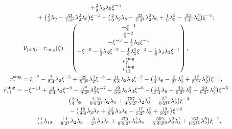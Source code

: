 \documentclass[pdftex]{sigma}
\numberwithin{equation}{section}
\begin{document}
\begin{gather*}
 + \tfrac{2}{9} \lambda_2 \lambda_5 \xi^{-4} \notag \\
\hphantom{\mathcal{V}_{(3,7)}\colon \ r_{11}^{\textup{sing}} =}{}
+ \big(\tfrac{2}{3}\lambda_9 + \tfrac{32}{7\cdot 3^3}\lambda_2^2 \lambda_5\big) \xi^{-2} - \big(\tfrac{2}{9}\lambda_2 \lambda_8 - \tfrac{32}{7\cdot 3^3}\lambda_2^2 \lambda_6 +
 \tfrac{1}{9}\lambda_5^2 - \tfrac{32}{7\cdot 3^6} \lambda_2^5 \big) \xi^{-1}; \notag\\
 \mathcal{V}_{(4,5)}\colon \ r_{\textup{sing}} (\xi) =\begin{pmatrix} -\xi^{-1} \\
 \xi^{-2} \\ -\xi^{-3} - \tfrac{1}{4}\lambda_2 \xi^{-1} \vspace{1mm}\\ -\xi^{-6} - \tfrac{1}{2}\lambda_3 \xi^{-3}
 - \tfrac{1}{8} \lambda_2^2 \xi^{-2} + \tfrac{1}{8} \lambda_2 \lambda_3 \xi^{-1} \vspace{1mm}\\
 r_{7}^{\textup{sing}} \\ r_{11}^{\textup{sing}}
 \end{pmatrix}, \\ %
\hphantom{\mathcal{V}_{(4,5)}\colon}{} \ r_{7}^{\textup{sing}} = \xi^{-7} - \tfrac{7}{5\cdot 4} \lambda_2 \xi^{-5} + \tfrac{29}{5\cdot 2^5} \lambda_2^2 \xi^{-3}
 - \tfrac{11}{5\cdot 8}\lambda_2 \lambda_3 \xi^{-2} - \big(\tfrac{1}{4} \lambda_6 - \tfrac{3}{2^5} \lambda_3^2
 + \tfrac{17}{5\cdot 2^7} \lambda_2^3\big) \xi^{-1}, \notag \\
\hphantom{\mathcal{V}_{(4,5)}\colon}{} \ r_{11}^{\textup{sing}} = -\xi^{-11} + \tfrac{11}{9\cdot 4} \lambda_2 \xi^{-9}
 - \tfrac{7^2}{9\cdot 2^5} \lambda_2^2 \xi^{-7} + \tfrac{19}{9\cdot 8}\lambda_2 \lambda_3 \xi^{-6}
 - \!\big(\tfrac{11}{5\cdot 4}\lambda_6 - \tfrac{33}{5\cdot 2^5} \lambda_3^2
 - \tfrac{29}{9\cdot 2^7} \lambda_2^3\big) \xi^{-5} \notag\\
\hphantom{\mathcal{V}_{(4,5)}\colon \ r_{11}^{\textup{sing}} =}{}
 - \big(\tfrac{3}{4} \lambda_8 - \tfrac{2\cdot 16}{9\cdot 5\cdot 2^4} \lambda_2 \lambda_6
 + \tfrac{757}{9\cdot 5\cdot 2^7} \lambda_2 \lambda_3^2 - \tfrac{5^3}{9\cdot 2^{11}} \lambda_2^4\big) \xi^{-3}\nonumber\\
\hphantom{\mathcal{V}_{(4,5)}\colon \ r_{11}^{\textup{sing}} =}{} - \big(\tfrac{19}{9\cdot 8} \lambda_2 \lambda_7 + \tfrac{13}{5\cdot 8} \lambda_3 \lambda_6
 - \tfrac{17}{5\cdot 2^5} \lambda_3^3 + \tfrac{19}{9 \cdot 2^6} \big) \xi^{-2} \notag \\
\hphantom{\mathcal{V}_{(4,5)}\colon \ r_{11}^{\textup{sing}} =}{}
- \big(\tfrac{1}{4}\lambda_{10} - \tfrac{11}{9\cdot 2^4}\lambda_2 \lambda_8 - \tfrac{3}{2^4} \lambda_3 \lambda_7 + \tfrac{479}{9\cdot 5\cdot 2^7} \lambda_2^2 \lambda_6 - \tfrac{659}{5\cdot 3\cdot 2^{10}}
 \lambda_2^2 \lambda_3^2 + \tfrac{163}{9\cdot 2^{13}} \lambda_2^5\big)\xi^{-1}. \notag
\end{gather*}
\end{document}
